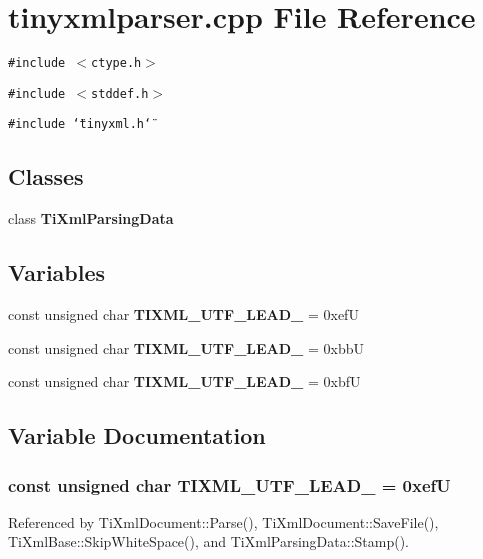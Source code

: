 \section{tinyxmlparser.cpp File Reference}
\label{tinyxmlparser_8cpp}


{\tt \#include $<$ctype.h$>$}\par
{\tt \#include $<$stddef.h$>$}\par
{\tt \#include \char`\"{}tinyxml.h\char`\"{}}\par
\subsection*{Classes}
\begin{CompactItemize}
\item 
class {\bf TiXmlParsingData}
\end{CompactItemize}
\subsection*{Variables}
\begin{CompactItemize}
\item 
const unsigned char {\bf TIXML\_\-UTF\_\-LEAD\_} = 0xefU
\item 
const unsigned char {\bf TIXML\_\-UTF\_\-LEAD\_} = 0xbbU
\item 
const unsigned char {\bf TIXML\_\-UTF\_\-LEAD\_} = 0xbfU
\end{CompactItemize}


\subsection{Variable Documentation}
\subsubsection[TIXML\_\-UTF\_\-LEAD\_\-0]{\setlength{\rightskip}{0pt plus 5cm}const unsigned char {\bf TIXML\_\-UTF\_\-LEAD\_} = 0xefU}\label{tinyxmlparser_8cpp_37999e32163e2a3280bc0b8e1999774e}




Referenced by TiXmlDocument::Parse(), TiXmlDocument::SaveFile(), TiXmlBase::SkipWhiteSpace(), and TiXmlParsingData::Stamp().
